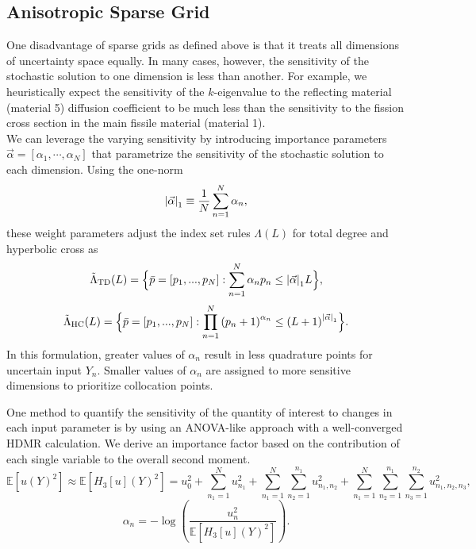 \documentclass[11pt]{article}
\newcommand{\expv}[1]{\ensuremath{\mathbb{E}[ #1]}}
\begin{document}
\subsection{Anisotropic Sparse Grid}
One disadvantage of sparse grids as defined above is that it treats all dimensions of uncertainty space equally.  In many cases, however, the sensitivity of the stochastic solution to one dimension is less than another.  For example, we heuristically expect the sensitivity of the $k$-eigenvalue to the reflecting material (material 5) diffusion coefficient to be much less than the sensitivity to the fission cross section in the main fissile material (material 1).  \\

We can leverage the varying sensitivity by introducing importance parameters $\vec\alpha=[\alpha_1,\cdots,\alpha_N]$ that parametrize the sensitivity of the stochastic solution to each dimension.  Using the one-norm
\begin{equation}
\qty|\vec\alpha|_1\equiv\frac{1}{N}\sum_{n=1}^N \alpha_n,
\end{equation}
these weight parameters adjust the index set rules $\Lambda(L)$ for total degree and hyperbolic cross as
\begin{equation}
\tilde\Lambda_\text{TD}(L)=\Big\{\bar p=[p_1,...,p_N]:\sum_{n=1}^N \alpha_n p_n \leq \qty|\vec\alpha|_1 L \Big\},
\end{equation}
\begin{equation}
\tilde\Lambda_\text{HC}(L)=\Big\{\bar p=[p_1,...,p_N]:\prod_{n=1}^N \qty(p_n+1)^{\alpha_n} \leq \qty(L+1)^{\qty|\vec\alpha|_1} \Big\}.
\end{equation}
In this formulation, greater values of $\alpha_n$ result in less quadrature points for uncertain input $Y_n$.  Smaller values of $\alpha_n$ are assigned to more sensitive dimensions to prioritize collocation points.

One method to quantify the sensitivity of the quantity of interest to changes in each input parameter is by using an ANOVA-like approach with a well-converged HDMR calculation.  We derive an importance factor based on the contribution of each single variable to the overall second moment.
\begin{equation}
\expv{u(Y)^2} \approx \expv{H_3[u](Y)^2} =
                    u_0^2 + \sum_{n_1=1}^N u_{n_1}^2 + \sum_{n_1=1}^N\sum_{n_2=1}^{n_1} u_{n_1,n_2}^2 + 
                     \sum_{n_1=1}^N\sum_{n_2=1}^{n_1}\sum_{n_3=1}^{n_2}u_{n_1,n_2,n_3}^2,
\end{equation}
\begin{equation}
\alpha_n = -\log\left(\frac{u_n^2}{\expv{H_3[u](Y)^2}}\right).
\end{equation}
\end{document}
